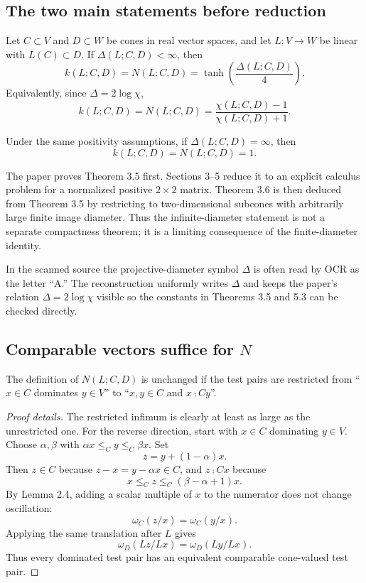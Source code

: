 \subsection{The two main statements before reduction}
\begin{theorem}
Let $C\subset V$ and $D\subset W$ be cones in real vector spaces, and let
$L:V\to W$ be linear with $L(C)\subset D$.  If
$\Delta(L;C,D)<\infty$, then
\[
  k(L;C,D)=N(L;C,D)
  =\tanh\!\left(\frac{\Delta(L;C,D)}{4}\right).
\]
Equivalently, since $\Delta=2\log\chi$,
\[
  k(L;C,D)=N(L;C,D)=\frac{\chi(L;C,D)-1}{\chi(L;C,D)+1}.
\]
\end{theorem}

\begin{theorem}
Under the same positivity assumptions, if $\Delta(L;C,D)=\infty$, then
\[
  k(L;C,D)=N(L;C,D)=1.
\]
\end{theorem}

The paper proves Theorem 3.5 first.  Sections 3--5 reduce it to an explicit
calculus problem for a normalized positive $2\times2$ matrix.  Theorem 3.6 is
then deduced from Theorem 3.5 by restricting to two-dimensional subcones with
arbitrarily large finite image diameter.  Thus the infinite-diameter statement
is not a separate compactness theorem; it is a limiting consequence of the
finite-diameter identity.

\begin{remark}
In the scanned source the projective-diameter symbol $\Delta$ is often read by
OCR as the letter ``A.''  The reconstruction uniformly writes $\Delta$ and
keeps the paper's relation $\Delta=2\log\chi$ visible so the constants in
Theorems 3.5 and 5.3 can be checked directly.
\end{remark}

\subsection{Comparable vectors suffice for $N$}
\begin{lemma}
The definition of $N(L;C,D)$ is unchanged if the test pairs are restricted from ``$x\in C$ dominates $y\in V$'' to ``$x,y\in C$ and $x\comp C y$''.
\end{lemma}

\begin{proof}[Proof details]
The restricted infimum is clearly at least as large as the unrestricted one.
For the reverse direction, start with $x\in C$ dominating $y\in V$.
Choose $\alpha,\beta$ with $\alpha x\le_C y\le_C\beta x$.
Set
\[
  z=y+(1-\alpha)x.
\]
Then $z\in C$ because $z-x=y-\alpha x\in C$, and $z\comp C x$ because
\[
  x\le_C z\le_C(\beta-\alpha+1)x.
\]
By Lemma 2.4, adding a scalar multiple of $x$ to the numerator does not change oscillation:
\[
  \omega_C(z/x)=\omega_C(y/x).
\]
Applying the same translation after $L$ gives
\[
  \omega_D(Lz/Lx)=\omega_D(Ly/Lx).
\]
Thus every dominated test pair has an equivalent comparable cone-valued test pair.
\end{proof}

